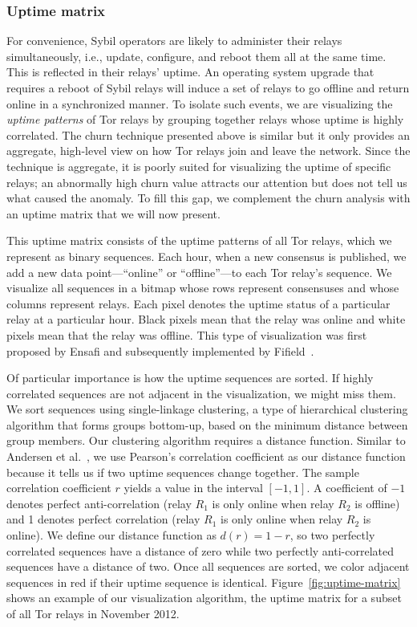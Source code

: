 \subsubsection{Uptime matrix}
\label{sec:uptime-matrix}
For convenience, Sybil operators are likely to administer their relays
simultaneously, i.e., update, configure, and reboot them all at the same time.
This is reflected in their relays' uptime.  An operating system upgrade that
requires a reboot of Sybil relays will induce a set of relays to go offline and
return online in a synchronized manner.  To isolate such events, we are
visualizing the \emph{uptime patterns} of Tor relays by grouping together relays
whose uptime is highly correlated.  The churn technique presented above is
similar but it only provides an aggregate, high-level view on how Tor relays
join and leave the network.  Since the technique is aggregate, it is poorly
suited for visualizing the uptime of specific relays; an abnormally high churn
value attracts our attention but does not tell us what caused the anomaly.  To
fill this gap, we complement the churn analysis with an uptime matrix that we
will now present.

This uptime matrix consists of the uptime patterns of all Tor relays, which we
represent as binary sequences.  Each hour, when a new consensus is published, we
add a new data point---``online'' or ``offline''---to each Tor relay's sequence.
We visualize all sequences in a bitmap whose rows represent consensuses and
whose columns represent relays.  Each pixel denotes the uptime status of a
particular relay at a particular hour.  Black pixels mean that the relay was
online and white pixels mean that the relay was offline.  This type of
visualization was first proposed by Ensafi and subsequently implemented by
Fifield~\cite{Fifield2014a}.

Of particular importance is how the uptime sequences are sorted.  If highly
correlated sequences are not adjacent in the visualization, we might miss them.
We sort sequences using single-linkage clustering, a type of hierarchical
clustering algorithm that forms groups bottom-up, based on the minimum distance
between group members.  Our clustering algorithm requires a distance function.
Similar to Andersen et al.~\cite[\S~II.B]{Andersen2002a}, we use Pearson's
correlation coefficient as our distance function because it tells us if two
uptime sequences change together.  The sample correlation coefficient $r$
yields a value in the interval $[-1, 1]$.  A coefficient of $-1$ denotes
perfect anti-correlation (relay $R_1$ is only online when relay $R_2$ is
offline) and 1 denotes perfect correlation (relay $R_1$ is only online when
relay $R_2$ is online).  We define our distance function as $d(r) = 1 - r$, so
two perfectly correlated sequences have a distance of zero while two perfectly
anti-correlated sequences have a distance of two.  Once all sequences are
sorted, we color adjacent sequences in red if their uptime sequence is
identical.  Figure~\ref{fig:uptime-matrix} shows an example of our
visualization algorithm, the uptime matrix for a subset of all Tor relays in
November 2012.

